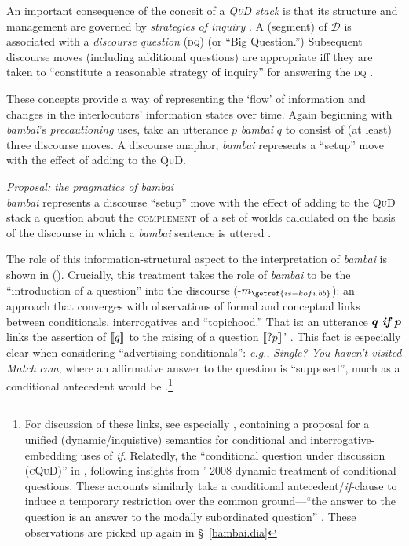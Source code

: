 \noindent An important consequence of the conceit of a \textit{\textsc{QuD} stack} is that its structure and management are governed by \textit{strategies of inquiry} \citep{Roberts1998,Roberts2004,Roberts2012}. A (segment) of $ \mathcal D $ is associated with a \textit{discourse question} \textsc{(dq)} (or ``Big Question.'') Subsequent discourse moves (including additional questions) are appropriate iff they are taken to ``constitute a reasonable strategy of inquiry'' for answering the \textsc{dq} \citep*{Simons2017}.

These concepts provide a way of representing the `flow' of information and changes in the interlocutors' information states over time. Again beginning with \textit{bambai}'s \textit{precautioning} uses, take an utterance $ p $ \textit{bambai} $ q $ to consist of (at least) three discourse moves. A discourse anaphor, \textit{bambai} represents a ``setup'' move with the effect of adding to the \textsc{QuD}. 

\ex \emph{Proposal: the pragmatics of \emph{bambai}}\\
\textit{bambai} represents a discourse ``setup'' move with the effect of adding to the \textsc{QuD} stack a question about the \textsc{complement} of a set of worlds calculated on the basis of the discourse in which a \textit{bambai} sentence is uttered	.\xe

\noindent The role of this information-structural aspect to the interpretation of \textit{bambai} is shown in (). Crucially, this treatment takes the role of \textit{bambai} to be the ``introduction of a question'' into the discourse (-$m_{\getref{is-kofi.bb}}$): an approach that converges with observations of formal and conceptual links between conditionals, interrogatives and ``topichood.'' That is: an utterance $\boldsymbol{ q\textit{ \textbf{if} }p }$ links the assertion of $ \llbracket{q}\rrbracket^{} $ to the raising of a question $\llbracket{ ?p}\rrbracket^{} $' \citep[36]{Starr2010}. This fact is especially clear when considering ``advertising conditionals'': \textit{e.g.}, \textit{Single? You haven't visited Match.com}, where an affirmative answer to the question is ``supposed'', much as a conditional antecedent would be \citep[4]{Starr2014a}.\footnote{For discussion of these links, see especially \citet{Starr2010,Starr2011,Starr2014a}, containing a proposal for a unified (dynamic/inquistive) semantics for conditional and interrogative-embedding uses of \textit{if}. Relatedly, the ``conditional question under discussion (\textsc{cQuD})'' in \citealp{Ippolito2013a}, following insights from \citeauthor{Isaacs2008}' 2008 dynamic treatment of conditional questions. These accounts similarly take a conditional antecedent/\textit{if}-clause to induce a temporary restriction over the common ground---``the answer to the question is an answer to the modally subordinated question'' \citep[200]{Ippolito2013a}. These observations are picked up again in \S~\ref{bambai.dia}}

